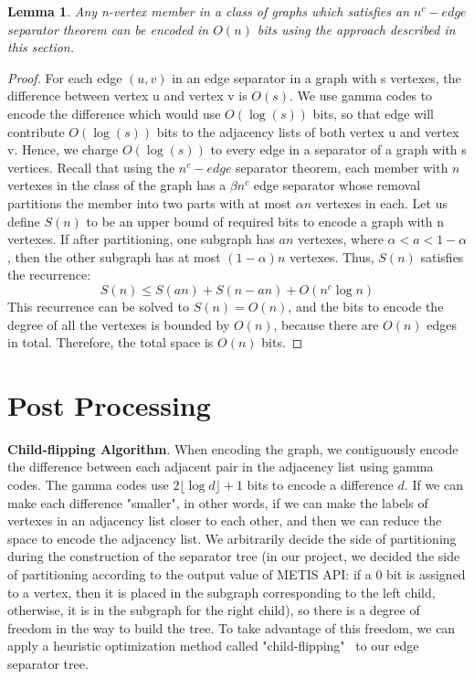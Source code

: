 \documentclass[12pt,glossary]{dalthesis}
\newtheorem{lemma}[theorem]{Lemma}
\begin{document}
\bigskip
\begin{lemma}
Any n-vertex member in a class of graphs which satisfies an $n^{c}-edge$ separator
theorem can be encoded in $O(n)$ bits using the approach described in this section.
\end{lemma}

\bigskip
\begin{proof}
For each edge $(u, v)$ in an edge separator in a graph with s vertexes, the difference
between vertex u and vertex v is $O(s)$. We use gamma codes to encode the difference which would use $O(\log (s))$ bits, so that edge will contribute $O(\log (s))$ bits to the adjacency lists of both vertex u and vertex v. Hence, we charge $O(\log (s))$ to every edge in a separator of a graph with s vertices. Recall that using the $n^{c}- edge$ separator theorem, each member with $n$ vertexes in the class of the graph has a $\beta n^{c}$ edge separator whose removal partitions the member into two parts with at most $\alpha n$ vertexes in each. Let us define $S(n)$ to be an upper bound of required bits to encode a graph with n vertexes. If after partitioning, one subgraph has $an$ vertexes, where $\alpha < a < 1 - \alpha $, then the other subgraph has at most $(1-\alpha)n$ vertexes. Thus, $S(n)$ satisfies the recurrence:
\[ S(n) \leq S(an) + S(n-an) + O(n^{c} \log n) \]
This recurrence can be solved to $S(n) = O(n)$, and the bits to encode the degree of all the vertexes is bounded by $O(n)$, because there are $O(n)$ edges in total. Therefore, the total space is $O(n)$ bits.
\end{proof}

\bigskip
\bigskip

\section{Post Processing}

\textbf{Child-flipping Algorithm}. When encoding the graph, we contiguously encode the difference between each adjacent pair in the adjacency list using gamma codes. The gamma codes use $2\lfloor \log d \rfloor + 1$ bits to encode a difference $d$. If we can make each difference "smaller", in other words, if we can make the labels of vertexes in an adjacency list closer to each other, and then we can reduce the space to encode the adjacency list. We arbitrarily decide the side of partitioning during the construction of the separator tree (in our project, we decided the side of partitioning according to the output value of METIS API: if a 0 bit is assigned to a vertex, then it is placed in the subgraph corresponding to the left child, otherwise, it is in the subgraph for the right child), so there is a degree of freedom in the way to build the tree. To take advantage of this freedom, we can apply a heuristic optimization method called "child-flipping"~\cite{compact-representation} to our edge separator tree.
\end{document}
